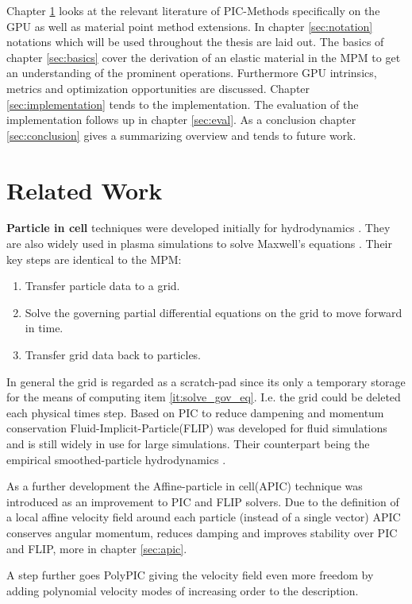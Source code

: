 \documentclass[m,times]{cgMA}
\begin{document}
Chapter \ref{sec:rel_work} looks at the relevant literature of PIC-Methods specifically on the GPU as well as material point method extensions. In chapter \ref{sec:notation} notations which will be used throughout the thesis are laid out. The basics of chapter \ref{sec:basics} cover the derivation of an elastic material in the MPM to get an understanding of the prominent operations. Furthermore GPU intrinsics, metrics and optimization opportunities are discussed. Chapter \ref{sec:implementation} tends to the implementation. The evaluation of the implementation follows up in chapter \ref{sec:eval}. As a conclusion chapter \ref{sec:conclusion} gives a summarizing overview and tends to future work.

\clearpage
\section{Related Work}\label{sec:rel_work}
\textbf{Particle in cell} techniques were developed initially for hydrodynamics \cite{evans1957particle}. They are also widely used in plasma simulations to solve Maxwell's equations \cite{PIC:GPU}. Their key steps are identical to the MPM:
\begin{enumerate}
  \item Transfer particle data to a grid.
\item \label{it:solve_gov_eq}Solve the governing partial differential equations on the grid to move forward in time.
  \item Transfer grid data back to particles.
\end{enumerate}
In general the grid is regarded as a scratch-pad since its only a temporary storage for the means of computing item \ref{it:solve_gov_eq}. I.e. the grid could be deleted each physical times step. Based on PIC to reduce dampening and momentum conservation Fluid-Implicit-Particle(FLIP) was developed for fluid simulations and is still widely in use for large simulations. Their counterpart being the empirical smoothed-particle hydrodynamics \cite{gingold1977smoothed}.

As a further development the Affine-particle in cell(APIC) technique was introduced as an improvement to PIC and FLIP solvers. Due to the definition of a local affine velocity field around each particle (instead of a single vector) APIC conserves angular momentum, reduces damping and improves stability over PIC and FLIP, more in chapter \ref{sec:apic}. \cite{MPM:APIC} \cite{MPM:OLD_APIC}

A step further goes PolyPIC giving the velocity field even more freedom by adding polynomial velocity modes of increasing order to the description. \cite{MPM:POLYPIC}
\end{document}
